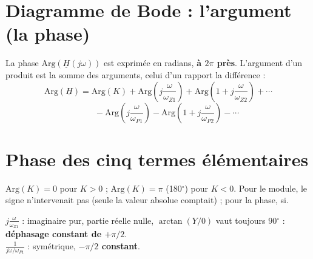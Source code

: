 \section{Diagramme de Bode : l'argument (la phase)}


\begin{thmbox}[title=Argument d'une fonction de transfert canonique]
La phase $\mathrm{Arg}(\underline H(j\omega))$ est exprimée en radians, \textbf{à $2\pi$
près}. L'argument d'un produit est la somme des arguments, celui d'un rapport la différence :
\[ \mathrm{Arg}(\underline H) = \mathrm{Arg}(K) + \mathrm{Arg}\left(j\frac\omega{\omega_{Z1}}\right)
   + \mathrm{Arg}\left(1 + j\frac\omega{\omega_{Z2}}\right) + \cdots \]
\[ \qquad - \mathrm{Arg}\left(j\frac\omega{\omega_{P1}}\right)
   - \mathrm{Arg}\left(1 + j\frac\omega{\omega_{P2}}\right) - \cdots \]
\end{thmbox}

\section{Phase des cinq termes élémentaires}


\begin{propbox}[title={Terme 1 : $K$}]
$\mathrm{Arg}(K) = 0$ pour $K > 0$ ; $\mathrm{Arg}(K) = \pi$ (180\ensuremath{^\circ}) pour $K < 0$. Pour le
module, le signe n'intervenait pas (seule la valeur absolue comptait) ; pour la phase, si.
\end{propbox}


\begin{propbox}[title={Termes 2 et 3 : imaginaires purs}]
$j\frac\omega{\omega_{Z1}}$ : imaginaire pur, partie réelle nulle, $\arctan(Y/0)$ vaut
toujours $90\ensuremath{^\circ}$ : \textbf{déphasage constant de $+\pi/2$}. \\
$\frac1{j\omega/\omega_{P1}}$ : symétrique, \textbf{$-\pi/2$ constant}.
\end{propbox}


